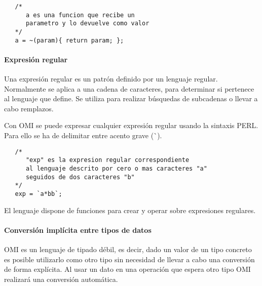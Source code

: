 \begin{lstlisting}
   /*
      a es una funcion que recibe un 
      parametro y lo devuelve como valor
   */
   a = ~(param){ return param; }; 
\end{lstlisting} 



\paragraph{Expresión regular}
Una expresión regular es un patrón definido por un lenguaje regular. Normalmente se aplica a una cadena de caracteres, para 
determinar si pertenece al lenguaje que define. Se utiliza para realizar búsquedas de subcadenas o llevar a cabo remplazos.

Con OMI se puede expresar cualquier expresión regular usando la sintaxis PERL. Para ello se ha de delimitar entre acento grave (\`\ ). \\

\begin{lstlisting}
   /*
      "exp" es la expresion regular correspondiente
      al lenguaje descrito por cero o mas caracteres "a" 
      seguidos de dos caracteres "b"
   */
   exp = `a*bb`; 
\end{lstlisting} 

El lenguaje dispone de funciones para crear y operar sobre expresiones regulares.


\paragraph{Conversión implícita entre tipos de datos}\label{sec:type_iconv}
OMI es un lenguaje de tipado débil, es decir, dado un valor de un tipo concreto es posible utilizarlo como otro tipo sin necesidad de 
llevar a cabo una conversión de forma explícita. Al usar un dato en una operación que espera  otro tipo OMI realizará
una conversión automática.



